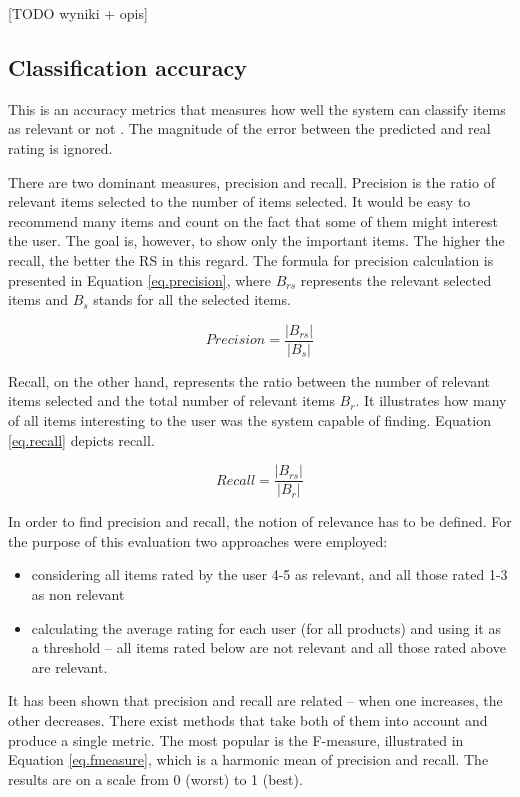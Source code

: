 \documentclass[12pt]{report}
\begin{document}
[TODO wyniki + opis]

\subsection{Classification accuracy}

This is an accuracy metrics that measures how well the system can classify items as relevant or not \cite{eval_twente}. The magnitude of the error between the predicted and real rating is ignored.

There are two dominant measures, precision and recall. Precision is the ratio of relevant items selected to the number of items selected. It would be easy to recommend many items and count on the fact that some of them might interest the user. The goal is, however, to show only the important items. The higher the recall, the better the RS in this regard. The formula for precision calculation is presented in Equation \ref{eq.precision}, where $B_{rs}$ represents the relevant selected items and $B_s$ stands for all the selected items.

\begin{equation}
Precision = \frac{|B_{rs}|}{|B_{s}|}
\label{eq.precision}
\end{equation}
\hbox{}

Recall, on the other hand, represents the ratio between the number of relevant items selected and the total number of relevant items $B_r$. It illustrates how many of all items interesting to the user was the system capable of finding. Equation \ref{eq.recall} depicts recall.

\begin{equation}
Recall = \frac{|B_{rs}|}{|B_{r}|}
\label{eq.recall}
\end{equation}
\hbox{}

In order to find precision and recall, the notion of relevance has to be defined. For the purpose of this evaluation two approaches were employed:
\begin{itemize}
\item considering all items rated by the user 4-5 as relevant, and all those rated 1-3 as non relevant
\item calculating the average rating for each user (for all products) and using it as a threshold -- all items rated below are not relevant and all those rated above are relevant.
\end{itemize}

It has been shown that precision and recall are related -- when one increases, the other decreases. There exist methods that take both of them into account and produce a single metric. The most popular is the F-measure, illustrated in Equation \ref{eq.fmeasure}, which is a harmonic mean of precision and recall. The results are on a scale from 0 (worst) to 1 (best).
\end{document}
